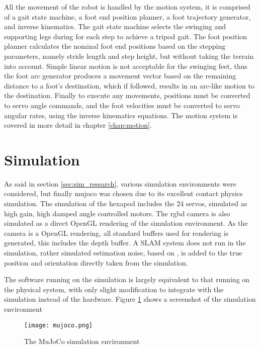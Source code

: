 All the movement of the robot is handled by the motion system, it is comprised of a gait state machine, a foot end position planner, a foot trajectory generator, and inverse kinematics. The gait state machine selects the swinging and supporting legs during for each step to achieve a tripod gait. The foot position planner calculates the nominal foot end positions based on the stepping parameters, namely stride length and step height, but without taking the terrain into account. Simple linear motion is not acceptable for the swinging feet, thus the foot arc generator produces a movement vector based on the remaining distance to a foot's destination, which if followed, results in an arc-like motion to the destination. Finally to execute any movements, positions must be converted to servo angle commands, and the foot velocities must be converted to servo angular rates, using the inverse kinematics equations. The motion system is covered in more detail in chapter \ref{chap:motion}.

\section{Simulation}
As said in section \ref{sec:sim_research}, various simulation environments were considered, but finally \ac{mujoco} was chosen due to its excellent contact physics simulation. The simulation of the hexapod includes the 24 servos, simulated as high gain, high damped angle controlled motors. The \ac{rgbd} camera is also simulated as a direct OpenGL rendering of the simulation environment. As the camera is a OpenGL rendering, all standard buffers used for rendering is generated, this includes the depth buffer. A SLAM system does not run in the simulation, rather simulated estimation noise, based on \cite{macario2022comprehensive}, is added to the true position and orientation directly taken from the simulation.

\newpage
\noindent
The software running on the simulation is largely equivalent to that running on the physical system, with only slight modification to integrate with the simulation instead of the hardware.
Figure \ref{fig:mujoco} shows a screenshot of the simulation environment
\begin{figure}[h]
    \centering
    \texttt{[image: mujoco.png]}
    \caption{The MuJoCo simulation environment}
    \label{fig:mujoco}
\end{figure}

